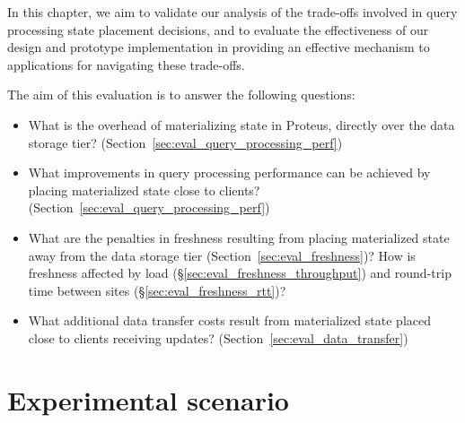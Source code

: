 
In this chapter, we aim to validate our analysis of the trade-offs involved in query processing state placement decisions,
and to evaluate the effectiveness of our design and prototype implementation in providing an effective mechanism to applications
for navigating these trade-offs.

The aim of this evaluation is to answer the following questions:

\begin{itemize}

  \item What is the overhead of materializing state in Proteus, directly over the data storage tier?
  (Section~\ref{sec:eval_query_processing_perf})

  \item What improvements in query processing performance can be achieved by placing materialized state close to clients?
  (Section~\ref{sec:eval_query_processing_perf})

  \item What are the penalties in freshness resulting from placing materialized state away from the data storage tier
  (Section~\ref{sec:eval_freshness})?
  How is freshness affected by load (\S\ref{sec:eval_freshness_throughput}) and round-trip time between
  sites (\S\ref{sec:eval_freshness_rtt})?

  \item What additional data transfer costs result from materialized state placed close to clients receiving updates?
  (Section~\ref{sec:eval_data_transfer})

\end{itemize}


\section{Experimental scenario}
\label{sec:eval_scenario}

